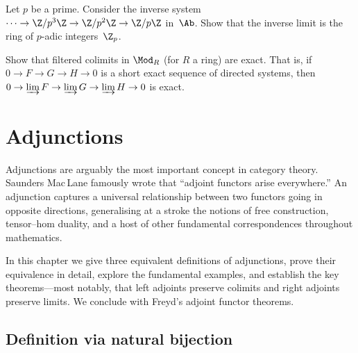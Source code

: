 \begin{exercise}\label{exer:inverse-limit-abelian-groups}
Let $p$ be a prime.  Consider the inverse system
$\cdots\to\Z/p^3\Z\to\Z/p^2\Z\to\Z/p\Z$
in~$\Ab$.  Show that the inverse limit is the ring of
$p$-adic integers~$\Z_p$.
\end{exercise}

\begin{exercise}\label{exer:filtered-colim-exact}
Show that filtered colimits in $\Mod_R$ (for $R$ a ring) are exact.
That is, if $0\to F\to G\to H\to 0$ is a short exact sequence
of directed systems, then
$0\to\varinjlim F\to\varinjlim G\to\varinjlim H\to 0$ is exact.
\end{exercise}


\newpage


\chapter{Adjunctions}\label{ch:adjunctions}
\minitoc

\vspace{1em}

Adjunctions are arguably the most important concept in category theory.
Saunders Mac\,Lane famously wrote that ``adjoint functors arise everywhere.''
An adjunction captures a universal relationship between two functors
going in opposite directions, generalising at a stroke the notions of
free construction, tensor--hom duality, and a host of other fundamental
correspondences throughout mathematics.

In this chapter we give three equivalent definitions of adjunctions,
prove their equivalence in detail, explore the fundamental examples,
and establish the key theorems---most notably, that left adjoints
preserve colimits and right adjoints preserve limits.  We conclude
with Freyd's adjoint functor theorems.


\section{Definition via natural bijection}\label{sec:adj-hom-def}


